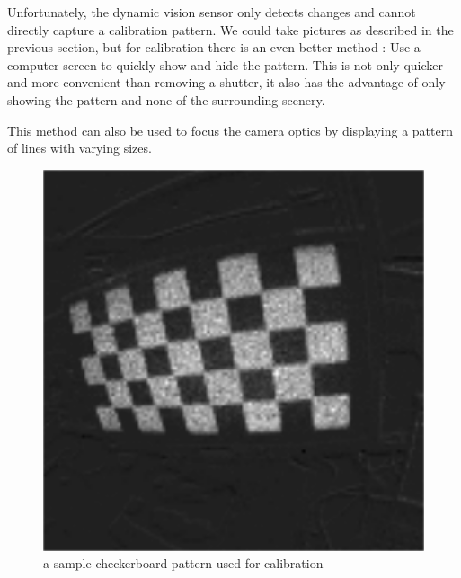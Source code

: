 Unfortunately, the dynamic vision sensor only detects changes and cannot
directly capture a calibration pattern. We could take pictures as described in
the previous section, but for calibration there is an even better method \cite{mueggler2014event}: Use a
computer screen to quickly show and hide the pattern. This is not only quicker
and more convenient than removing a shutter, it also has the advantage of only
showing the pattern and none of the surrounding scenery.

This method can also be used to focus the camera optics by displaying a pattern
of lines with varying sizes.

\begin{figure}
\includegraphics[width=\linewidth]{images/checkerboard_integrated.png}
\caption{a sample checkerboard pattern used for calibration}
\label{fig:calibration}
\end{figure}
